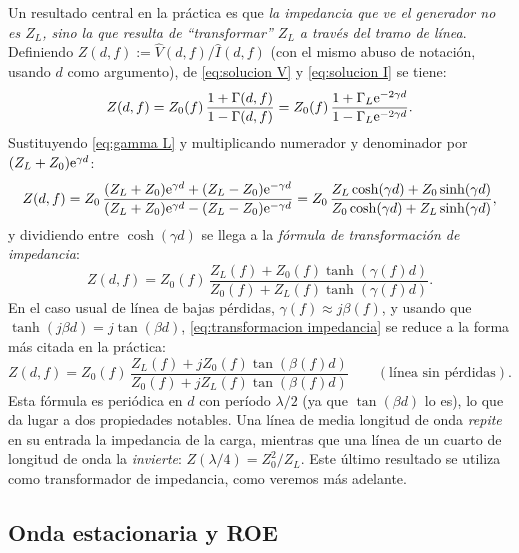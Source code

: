 Un resultado central en la práctica es que \emph{la impedancia que ve el generador no es $Z_L$, sino la que resulta de ``transformar'' $Z_L$ a través del tramo de línea}. Definiendo $Z(d,f):=\hat V(d,f)/\hat I(d,f)$ (con el mismo abuso de notación, usando $d$ como argumento), de \eqref{eq:solucion V} y \eqref{eq:solucion I} se tiene:
\begin{equation*}
    Z(d,f) = Z_0(f)\, \frac{1+\Gamma(d,f)}{1-\Gamma(d,f)} = Z_0(f)\, \frac{1+\Gamma_L\mathrm{e}^{-2\gamma d}}{1-\Gamma_L\mathrm{e}^{-2\gamma d}}.
\end{equation*}
Sustituyendo \eqref{eq:gamma L} y multiplicando numerador y denominador por $(Z_L+Z_0)\mathrm{e}^{\gamma d}$:
\begin{equation*}
    Z(d,f) = Z_0\, \frac{(Z_L+Z_0)\mathrm{e}^{\gamma d} + (Z_L-Z_0)\mathrm{e}^{-\gamma d}}{(Z_L+Z_0)\mathrm{e}^{\gamma d} - (Z_L-Z_0)\mathrm{e}^{-\gamma d}} = Z_0\, \frac{Z_L\cosh(\gamma d) + Z_0\sinh(\gamma d)}{Z_0\cosh(\gamma d) + Z_L\sinh(\gamma d)},
\end{equation*}
y dividiendo entre $\cosh(\gamma d)$ se llega a la \emph{fórmula de transformación de impedancia}:
\begin{equation}\label{eq:transformacion impedancia}
    Z(d,f) = Z_0(f)\, \frac{Z_L(f) + Z_0(f)\tanh\left(\gamma(f) d\right)}{Z_0(f) + Z_L(f)\tanh\left(\gamma(f) d\right)}.
\end{equation}
En el caso usual de línea de bajas pérdidas, $\gamma(f)\approx j\beta(f)$, y usando que $\tanh(j\beta d) = j\tan(\beta d)$, \eqref{eq:transformacion impedancia} se reduce a la forma más citada en la práctica:
\begin{equation}\label{eq:transformacion impedancia sin perdidas}
    Z(d,f) = Z_0(f)\, \frac{Z_L(f) + jZ_0(f)\tan(\beta(f) d)}{Z_0(f) + jZ_L(f)\tan(\beta(f) d)} \qquad (\text{línea sin pérdidas}).
\end{equation}
Esta fórmula es periódica en $d$ con período $\lambda/2$ (ya que $\tan(\beta d)$ lo es), lo que da lugar a dos propiedades notables. Una línea de media longitud de onda \emph{repite} en su entrada la impedancia de la carga, mientras que una línea de un cuarto de longitud de onda la \emph{invierte}: $Z(\lambda/4) = Z_0^2/Z_L$. Este último resultado se utiliza como transformador de impedancia, como veremos más adelante.

\subsection*{Onda estacionaria y ROE}

